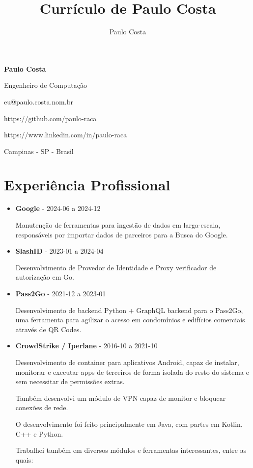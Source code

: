 \documentclass[a4paper,10pt]{article}
\title{Currículo de Paulo Costa}
\author{Paulo Costa}
\begin{document}
  
  \LARGE\textbf{Paulo Costa}

  \large Engenheiro de Computação

  \large eu@paulo.costa.nom.br

  \large https://github.com/paulo-raca

  \large https://www.linkedin.com/in/paulo-raca


  \large Campinas - SP - Brasil

  \normalsize 

  \section{Experiência Profissional}
    \begin{itemize}
      \item
        \textbf{Google} - 2024-06 a 2024-12

        Manutenção de ferramentas para ingestão de dados em larga-escala, responsáveis por importar dados de parceiros para a Busca do Google.

      \item
        \textbf{SlashID} - 2023-01 a 2024-04

        Desenvolvimento de Provedor de Identidade e Proxy verificador de autorização em Go.

      \item
        \textbf{Pass2Go} - 2021-12 a 2023-01

        Desenvolvimento de backend Python + GraphQL backend para o Pass2Go, uma ferramenta para agilizar o acesso em condomínios e edifícios comerciais através de QR Codes.

      \item
        \textbf{CrowdStrike / Iperlane} - 2016-10 a 2021-10

        Desenvolvimento de container para aplicativos Android, capaz de instalar, monitorar e executar
        apps de terceiros de forma isolada do resto do sistema e sem necessitar de permissões extras.

        Também desenvolvi um módulo de VPN capaz de monitor e bloquear conexões de rede.

        O desenvolvimento foi feito principalmente em Java, com partes em Kotlin, C++ e Python.

        Trabalhei também em diversos módulos e ferramentas interessantes, entre as quais:


\end{itemize}
\end{document}
